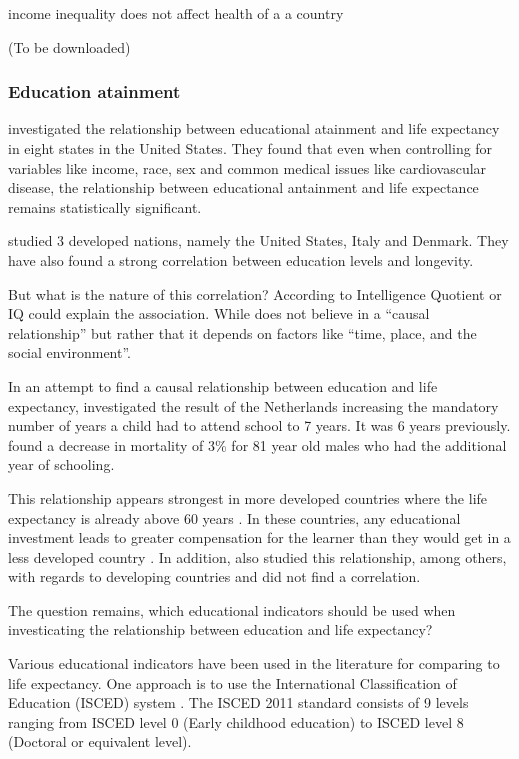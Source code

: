 \documentclass[12pt,a4paper]{article}
\begin{document}
income inequality does not affect health of a a country \cite{JasonBeckfield2004}

\cite{Tarkiainen2012} (To be downloaded)

\subsubsection{Education atainment}


\cite{Kaplan2015} investigated the relationship between educational atainment and life expectancy in eight states in the United States. They found that even when controlling for variables like income, race, sex and common medical issues like cardiovascular disease, the relationship between educational antainment and life expectance remains statistically significant.

\cite{Luy2019} studied 3 developed nations, namely the United States, Italy and Denmark. They have also found a strong correlation between education levels and longevity.



But what is the nature of this correlation? According to \cite{Deary2004} Intelligence Quotient or IQ could explain the association. While \cite{Hayward2015} does not believe in a ``causal relationship'' but rather that it depends on factors like ``time, place, and the social environment''.

In an attempt to find a causal relationship between education and life expectancy, \cite{VanKippersluis2009} investigated the result of the Netherlands increasing the mandatory number of years a child had to attend school to 7 years. It was 6 years previously. \cite{VanKippersluis2009} found a decrease in mortality of 3\% for 81 year old males who had the additional year of schooling. 

This relationship appears strongest in more developed countries where the life expectancy is already above 60 years \citep{Bulled2010}. In these countries, any educational investment leads to greater compensation for the learner than they would get in a less developed country \cite{Bulled2010,Handwerker1986}. In addition, \cite{Kabir2008} also studied this relationship, among others, with regards to developing countries and did not find a correlation.

The question remains, which educational indicators should be used when investicating the relationship between education and life expectancy?

Various educational indicators have been used in the literature for comparing to life expectancy. One approach is to use the International Classification of Education (ISCED) system \citep{UNESCO2012}. The ISCED 2011 standard consists of 9 levels ranging from ISCED level 0 (Early childhood education) to ISCED level 8 (Doctoral or equivalent level).
\end{document}

